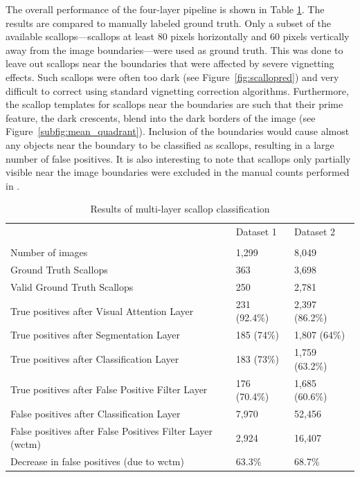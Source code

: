 \documentclass {udthesis}
\begin{document}
The overall performance of the four-layer pipeline is shown in Table \ref{tab:count_results}.  
The results are compared to manually labeled ground truth.
Only a subset of the available scallops---scallops at least 80 pixels horizontally and 60 pixels vertically away from the image boundaries---were used as ground truth.
This was done to leave out scallops near the boundaries that were affected by severe vignetting effects. 
Such scallops were often too dark (see Figure~\ref{fig:scallopred}) and very difficult to correct using standard vignetting correction algorithms.
Furthermore, the scallop templates for scallops near the boundaries are such that their prime feature, the dark crescents, blend into the dark borders of the image (see Figure~\ref{subfig:mean_quadrant}). 
Inclusion of the boundaries would cause almost any objects near the boundary to be classified as scallops, resulting in a large number of false positives.
It is also interesting to note that scallops only partially visible near the image boundaries were excluded in the manual counts performed in \cite{walker}.

\begin{table}
\caption{Results of multi-layer scallop classification \label{tab:count_results}}
\begin{center}
\begin{tabular}{lll}
\toprule[1pt]
 & Dataset 1 & Dataset 2\\[2pt]\cline{1-3}\\[-5pt]
Number of images & 1,299 & 8,049\\
Ground Truth Scallops & 363 & 3,698\\
Valid Ground Truth Scallops & 250 & 2,781\\
True positives after Visual Attention Layer & 231 (92.4\%) & 2,397 (86.2\%)\\
True positives after Segmentation Layer & 185 (74\%) & 1,807 (64\%)\\
True positives after Classification Layer & 183 (73\%) & 1,759 (63.2\%)\\
True positives after False Positive Filter Layer & 176 (70.4\%) & 1,685 (60.6\%)\\
False positives after Classification Layer & 7,970 & 52,456\\
False positives after False Positives Filter Layer (\gls{wctm}) & 2,924 & 16,407\\
Decrease in false positives (due to \gls{wctm}) & 63.3\% & 68.7\%\\ \bottomrule
                               \end{tabular}
                               \end{center}
                               \end{table}      
   
\end{document}
